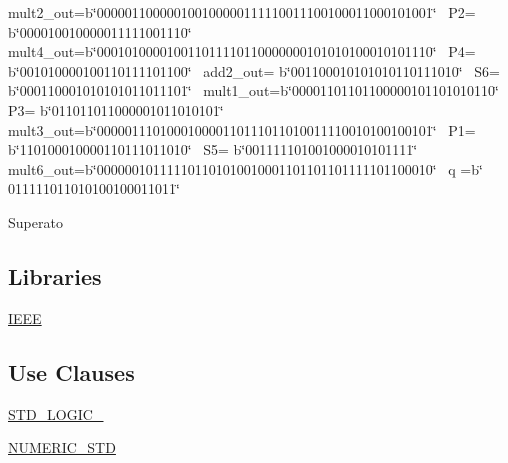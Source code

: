 \begin{DoxyCompactItemize}
\begin{DoxyCompactList}
mult2\+\_\+out=b\char`\"{}000001100000100100000111110011100100011000101001\char`\"{}~\newline
 P2= b\char`\"{}000010010000011111001110\char`\"{}~\newline
 mult4\+\_\+out=b\char`\"{}000101000010011011110110000000101010100010101110\char`\"{}~\newline
 P4= b\char`\"{}001010000100110111101100\char`\"{}~\newline
 add2\+\_\+out= b\char`\"{}001100010101010110111010\char`\"{}~\newline
 S6= b\char`\"{}000110001010101011011101\char`\"{}~\newline
 mult1\+\_\+out=b\char`\"{}00001101101100000101101010110\char`\"{}~\newline
 P3= b\char`\"{}011011011000001011010101\char`\"{}~\newline
 mult3\+\_\+out=b\char`\"{}000001110100010000110111011010011110010100100101\char`\"{}~\newline
 P1= b\char`\"{}110100010000110111011010\char`\"{}~\newline
 S5= b\char`\"{}001111101001000010101111\char`\"{}~\newline
 mult6\+\_\+out=b\char`\"{}000000101111101101010010001101101101111101100010\char`\"{}~\newline
 q =b\char`\"{}       011111011010100100011011\char`\"{}  

Superato  \end{DoxyCompactList}\end{DoxyCompactItemize}
\subsection*{Libraries}
 \begin{DoxyCompactItemize}
\item 
\hyperlink{group___linear_regression_gae4f03c286607f3181e16b9aa12d0c6d4}{I\+E\+EE} 
\end{DoxyCompactItemize}
\subsection*{Use Clauses}
 \begin{DoxyCompactItemize}
\item 
\hyperlink{group___linear_regression_gaa4b2b25246a821511120e3149b003563}{S\+T\+D\+\_\+\+L\+O\+G\+I\+C\+\_}   
\item 
\hyperlink{group___linear_regression_gae00f3f04545af57582ff10609eee23e2}{N\+U\+M\+E\+R\+I\+C\+\_\+\+S\+TD}   
\end{DoxyCompactItemize}
